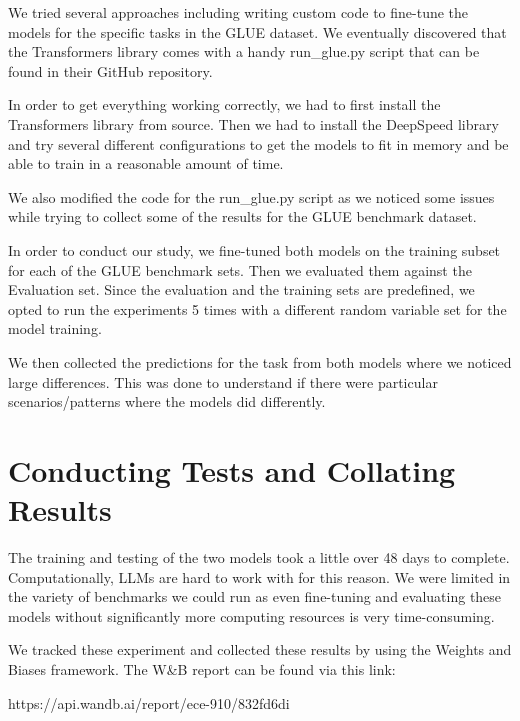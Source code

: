 \documentclass[\main/thesis.tex]{subfiles}
\begin{document}
We tried several approaches including writing custom code to fine-tune the models for 
the specific tasks in the GLUE dataset. We eventually discovered that the Transformers library 
comes with a handy run\_glue.py script that can be found in their GitHub repository.

In order to get everything working correctly, we had to first install the Transformers library 
from source. Then we had to install the DeepSpeed library and try several different configurations 
to get the models to fit in memory and be able to train in a reasonable amount of time. 


We also modified the code for the run\_glue.py script as we noticed some issues while trying to collect
some of the results for the GLUE benchmark dataset. 


In order to conduct our study, we fine-tuned both models on the training subset for each of the GLUE 
benchmark sets. Then we evaluated them against the Evaluation set. Since the evaluation and the 
training sets are predefined, we opted to run the experiments 5 times with a different random variable set 
for the model training. 

We then collected the predictions for the task from both models where we noticed 
large differences. This was done to understand if there were particular scenarios/patterns where the 
models did differently. 

\section{Conducting Tests and Collating Results}

The training and testing of the two models took a little over 48 days to complete. Computationally, 
LLMs are hard to work with for this reason. We were limited in the variety of benchmarks we could run
as even fine-tuning and evaluating these models without significantly more computing resources is very 
time-consuming. 

We tracked these experiment and collected these results by using the Weights and Biases framework. The 
W\&B report can be found via this link: 

https://api.wandb.ai/report/ece-910/832fd6di
\end{document}
